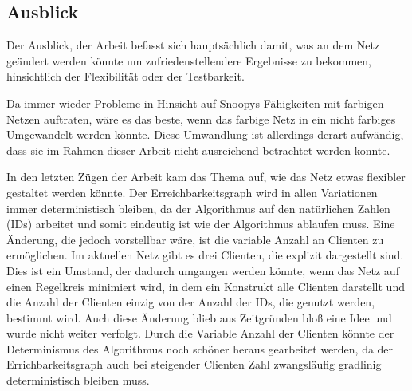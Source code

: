 \subsection{Ausblick}
Der Ausblick, der Arbeit befasst sich hauptsächlich damit, was an dem Netz geändert werden könnte um zufriedenstellendere Ergebnisse zu bekommen, hinsichtlich der Flexibilität oder der Testbarkeit.

Da immer wieder Probleme in Hinsicht auf Snoopys Fähigkeiten mit farbigen Netzen auftraten, wäre es das beste, wenn das farbige Netz in ein nicht farbiges Umgewandelt werden könnte. Diese Umwandlung ist allerdings derart aufwändig, dass sie im Rahmen dieser Arbeit nicht ausreichend betrachtet werden konnte. 

In den letzten Zügen der Arbeit kam das Thema auf, wie das Netz etwas flexibler gestaltet werden könnte. Der Erreichbarkeitsgraph wird in allen Variationen immer deterministisch bleiben, da der Algorithmus auf den natürlichen Zahlen (IDs) arbeitet und somit eindeutig ist wie der Algorithmus ablaufen muss. Eine Änderung, die jedoch vorstellbar wäre, ist die variable Anzahl an Clienten zu ermöglichen. Im aktuellen Netz gibt es drei Clienten, die explizit dargestellt sind. Dies ist ein Umstand, der dadurch umgangen werden könnte, wenn das Netz auf einen Regelkreis minimiert wird, in dem ein Konstrukt alle Clienten darstellt und die Anzahl der Clienten einzig von der Anzahl der IDs, die genutzt werden, bestimmt wird.
Auch diese Änderung blieb aus Zeitgründen bloß eine Idee und wurde nicht weiter verfolgt. Durch die Variable Anzahl der Clienten könnte der Determinismus des Algorithmus noch schöner heraus gearbeitet werden, da der Errichbarkeitsgraph auch bei steigender Clienten Zahl zwangsläufig gradlinig deterministisch bleiben muss.
